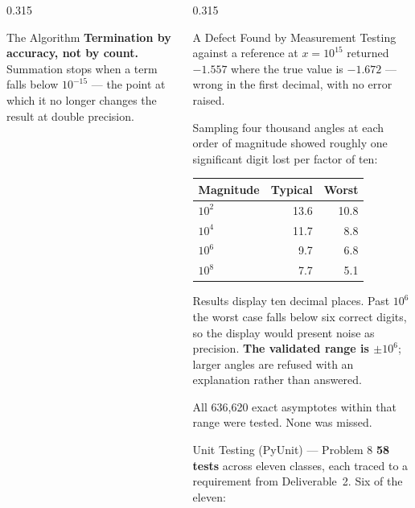 \documentclass[final]{beamer}
\begin{document}
\begin{frame}[t]
\begin{columns}[t]
\begin{column}{0.315\textwidth}
\begin{block}{The Algorithm}
  \textbf{Termination by accuracy, not by count.} Summation stops when
  a term falls below $10^{-15}$ --- the point at which it no longer
  changes the result at double precision.
\end{block}




\end{column}

\begin{column}{0.315\textwidth}

\begin{block}{A Defect Found by Measurement}
  Testing against a reference at $x = 10^{15}$ returned $-1.557$ where
  the true value is $-1.672$ --- wrong in the first decimal, with no
  error raised.
  \vspace{0.3cm}

  Sampling four thousand angles at each order of magnitude showed
  roughly one significant digit lost per factor of ten:
  \vspace{0.2cm}

  \centering
  \begin{tabular}{lrr}
    \toprule
    \textbf{Magnitude} & \textbf{Typical} & \textbf{Worst} \\
    \midrule
    $10^{2}$ & 13.6 & 10.8 \\
    $10^{4}$ & 11.7 & 8.8 \\
    $10^{6}$ & 9.7 & 6.8 \\
    $10^{8}$ & 7.7 & 5.1 \\
    \bottomrule
  \end{tabular}
  \vspace{0.3cm}

  \raggedright
  Results display ten decimal places. Past $10^{6}$ the worst case
  falls below six correct digits, so the display would present noise as
  precision. \textbf{The validated range is $\pm 10^{6}$}; larger
  angles are refused with an explanation rather than answered.
  \vspace{0.2cm}

  All 636{,}620 exact asymptotes within that range were tested. None
  was missed.
\end{block}

\begin{block}{Unit Testing (PyUnit) --- Problem 8}
  \textbf{58 tests} across eleven classes, each traced to a
  requirement from Deliverable~2. Six of the eleven:
  \vspace{0.3cm}


\end{block}
\end{column}
\end{columns}
\end{frame}
\end{document}
